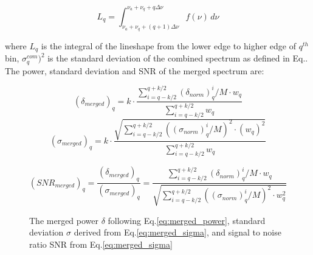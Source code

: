 \begin{equation}
    \label{eq:Lq_integtal}
    L_{q} = \int_{\nu_a +\nu_q + (q+1)\Delta\nu}^{\nu_a +\nu_q + q\Delta\nu} f(\nu) \,d\nu
\end{equation}

where $L_q$ is the integral of the lineshape from the lower edge to higher edge of ${q^{th}}$ bin, $\sigma_{q}^{com})^{2}$ is the standard deviation of the combined spectrum as defined in Eq.\cite{eq:weighted_sigma}. The power, standard deviation and SNR of the merged spectrum are:


\begin{equation}
    \label{eq:merged_power}
    (\delta_{merged})_q = k \cdot \frac{ \sum_{i = q-k/2}^{q+k/2}(\delta_{norm})_{q}^{i}/M \cdot {w_{q}}}{\sum_{i = q-k/2}^{q+k/2} {w_{q}}}
\end{equation}
\begin{equation}
    \label{eq:merged_sigma}
    (\sigma_{merged})_q = k \cdot \frac{ \sqrt{\sum_{i = q-k/2}^{q+k/2} ((\sigma_{norm})_{q}^{i}/M)^2 \cdot {(w_{q})^2}}}{\sum_{i = q-k/2}^{q+k/2} {w_{q}}}
\end{equation}

\begin{equation}
    \label{eq:merged_snr}
    ({SNR}_{merged})_q = \frac{(\delta_{merged})_q}{(\sigma_{merged})_q} = \frac{\sum_{i = q-k/2}^{q+k/2}(\delta_{norm})_{q}^{i}/M \cdot {w_{q}}}{ \sqrt{\sum_{i = q-k/2}^{q+k/2} ((\sigma_{norm})_{q}^{i}/M)^2 \cdot {w_{q}^2}}}
\end{equation}


\begin{figure}[h]
    \centering
    \caption{The merged power $\delta$ following Eq.\eqref{eq:merged_power}, standard deviation $\sigma$ derived from Eq.\eqref{eq:merged_sigma}, and signal to noise ratio SNR from Eq.\eqref{eq:merged_sigma}}
    \label{fig:merged_data}
\end{figure}

